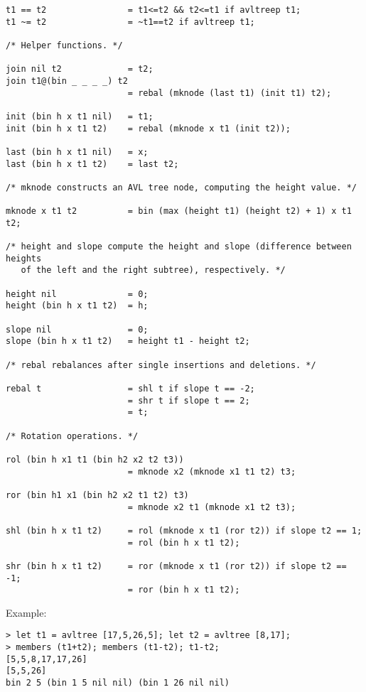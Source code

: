 \documentclass[a4paper,12pt]{article}
\begin{document}
\begin{lstlisting}
t1 == t2                = t1<=t2 && t2<=t1 if avltreep t1;
t1 ~= t2                = ~t1==t2 if avltreep t1;

/* Helper functions. */

join nil t2             = t2;
join t1@(bin _ _ _ _) t2
                        = rebal (mknode (last t1) (init t1) t2);

init (bin h x t1 nil)   = t1;
init (bin h x t1 t2)    = rebal (mknode x t1 (init t2));

last (bin h x t1 nil)   = x;
last (bin h x t1 t2)    = last t2;

/* mknode constructs an AVL tree node, computing the height value. */

mknode x t1 t2          = bin (max (height t1) (height t2) + 1) x t1 t2;

/* height and slope compute the height and slope (difference between heights
   of the left and the right subtree), respectively. */

height nil              = 0;
height (bin h x t1 t2)  = h;

slope nil               = 0;
slope (bin h x t1 t2)   = height t1 - height t2;

/* rebal rebalances after single insertions and deletions. */

rebal t                 = shl t if slope t == -2;
                        = shr t if slope t == 2;
                        = t;

/* Rotation operations. */

rol (bin h x1 t1 (bin h2 x2 t2 t3))
                        = mknode x2 (mknode x1 t1 t2) t3;

ror (bin h1 x1 (bin h2 x2 t1 t2) t3)
                        = mknode x2 t1 (mknode x1 t2 t3);

shl (bin h x t1 t2)     = rol (mknode x t1 (ror t2)) if slope t2 == 1;
                        = rol (bin h x t1 t2);

shr (bin h x t1 t2)     = ror (mknode x t1 (ror t2)) if slope t2 == -1;
                        = ror (bin h x t1 t2);
\end{lstlisting}

\noindent Example:

\begin{lstlisting}
> let t1 = avltree [17,5,26,5]; let t2 = avltree [8,17];
> members (t1+t2); members (t1-t2); t1-t2;
[5,5,8,17,17,26]
[5,5,26]
bin 2 5 (bin 1 5 nil nil) (bin 1 26 nil nil)
\end{lstlisting}
\end{document}
